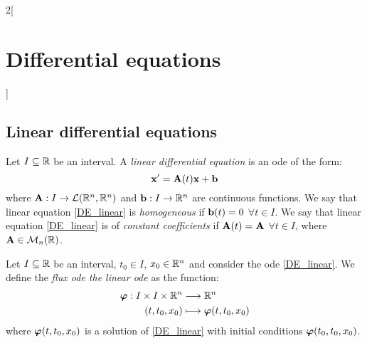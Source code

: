 \documentclass[../../../main.tex]{subfiles}
\begin{document}
\begin{multicols}{2}[\section{Differential equations}]
  \subsection{Linear differential equations}
  \begin{definition}
    Let $I\subseteq\mathbb{R}$ be an interval. A \textit{linear differential equation} is an ode of the form:
    \begin{equation}\label{DE_linear}
      \boldsymbol{\mathrm{x}}'=\boldsymbol{\mathrm{A}}(t)\boldsymbol{\mathrm{x}}+\boldsymbol{\mathrm{b}}
    \end{equation}
    where $\boldsymbol{\mathrm{A}}:I\rightarrow\mathcal{L}(\mathbb{R}^n,\mathbb{R}^n)$ and $\boldsymbol{\mathrm{b}}:I\rightarrow\mathbb{R}^n$ are continuous functions.
    We say that linear equation \eqref{DE_linear} is \textit{homogeneous} if $\boldsymbol{\mathrm{b}}(t)=0$ $\forall t\in I$. We say that linear equation \eqref{DE_linear} is of \textit{constant coefficients} if $\boldsymbol{\mathrm{A}}(t)=\boldsymbol{\mathrm{A}}$ $\forall t\in I$, where $\boldsymbol{\mathrm{A}}\in\mathcal{M}_n(\mathbb{R})$.
  \end{definition}
  \begin{definition}
    Let $I\subseteq\mathbb{R}$ be an interval, $t_0\in I$, $x_0\in\mathbb{R}^n$ and consider the ode \eqref{DE_linear}. We define the \textit{flux ode the linear ode} as the function:
    \begin{align*}
      \boldsymbol{\mathrm{\varphi}}:I\times I\times \mathbb{R}^n & \longrightarrow\mathbb{R}^n                           \\
      (t,t_0,x_0)                                    & \longmapsto\boldsymbol{\mathrm{\varphi}}(t,t_0,x_0)
    \end{align*}
    where $\boldsymbol{\mathrm{\varphi}}(t,t_0,x_0)$ is a solution of \eqref{DE_linear} with initial conditions $\boldsymbol{\mathrm{\varphi}}(t_0,t_0,x_0)$.
  \end{definition}

\end{multicols}
\end{document}
